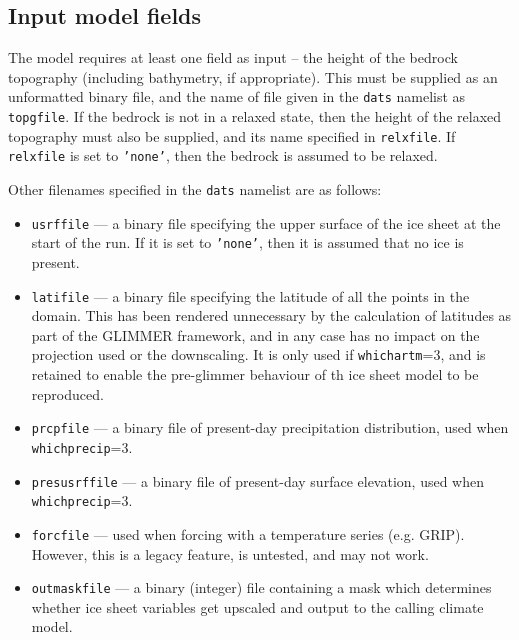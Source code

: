 \documentclass[11pt]{article}
\begin{document}
\subsection{Input model fields}
%
The model requires at least one field as input -- the height of the bedrock
topography (including bathymetry, if appropriate). This must be supplied as an
unformatted binary file, and the name of file given in the \texttt{dats}
namelist as \texttt{topgfile}. If the bedrock is not in a relaxed state, then
the height of the relaxed topography must also be supplied, and its name
specified in \texttt{relxfile}. If \texttt{relxfile} is set to \texttt{'none'},
then the bedrock is assumed to be relaxed.

Other filenames specified in the \texttt{dats} namelist are as follows:
\begin{itemize}
\item \texttt{usrffile} --- a binary file specifying the upper surface of the
ice sheet at the start of the run. If it is set to \texttt{'none'}, then it is
assumed that no ice is present.
\item \texttt{latifile} --- a binary file specifying the latitude of all the
  points in the domain. This has been rendered unnecessary by the calculation
  of latitudes as part of the GLIMMER framework, and in any case has no impact
  on the projection used or the downscaling. It is only used if
  \texttt{whichartm}=3, and is retained to enable the pre-glimmer behaviour of
  th ice sheet model to be reproduced.
\item \texttt{prcpfile} --- a binary file of present-day precipitation
  distribution, used when \texttt{whichprecip}=3.
\item \texttt{presusrffile} --- a binary file of present-day surface
  elevation, used when \texttt{whichprecip}=3.
\item \texttt{forcfile} --- used when forcing with a temperature series
  (e.g. GRIP). However, this is a legacy feature, is untested, and may not
  work.
\item \texttt{outmaskfile} --- a binary (integer) file containing a mask which
  determines whether ice sheet variables get upscaled and output to the
  calling climate model.
\end{itemize}
\end{document}
